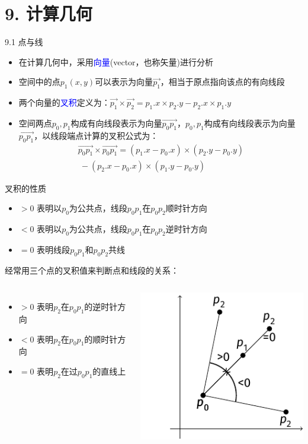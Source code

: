 


\frame{\titlepage}
\section{9. 计算几何}
\begin{frame}{9.1 点与线}
    \begin{itemize}
        \item 在计算几何中，采用\textcolor{blue}{向量}(vector，也称矢量)进行分析
        \item 空间中的点$p_1(x,y)$可以表示为向量$\vec{p_1}$，相当于原点指向该点的有向线段
        \item 两个向量的\textcolor{blue}{叉积}定义为：$\vec{p_1}\times \vec{p_2}=p_1.x\times p_2.y-p_2.x\times p_1.y$
        \item 空间两点$p_0,p_1$构成有向线段表示为向量$\vec{p_0p_1}$，$p_0,p_1$构成有向线段表示为向量$\overrightarrow{p_0p_1}$，以线段端点计算的叉积公式为：
        $$\begin{aligned}\overrightarrow{p_0p_1}\times \overrightarrow{p_0p_1}=(p_1.x-p_0.x)\times (p_2.y-p_0.y) \\\ -(p_2.x-p_0.x)\times (p_1.y-p_0.y) \end{aligned}$$
    \end{itemize}
\end{frame}
\begin{frame}{叉积的性质}
    \begin{itemize}
        \item $> 0$ 表明以$p_0$为公共点，线段$p_0p_1$在$p_0p_2$顺时针方向
        \item $< 0$ 表明以$p_0$为公共点，线段$p_0p_1$在$p_0p_2$逆时针方向
        \item $= 0$ 表明线段$p_0p_1$和$p_0p_2$共线
    \end{itemize}    
    \vfill
    经常用三个点的叉积值来判断点和线段的关系：
    \begin{columns}
        \begin{itemize}
        \item $> 0$ 表明$p_2$在$p_0p_1$的逆时针方向
        \item $< 0$ 表明$p_2$在$p_0p_1$的顺时针方向
        \item $= 0$ 表明$p_2$在过$p_0p_1$的直线上
        \end{itemize}   
        \includegraphics[scale=.8]{fig/9-1.pdf}
    \end{columns}
\end{frame}
